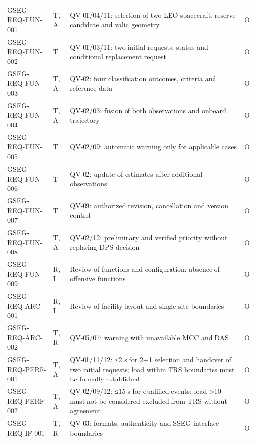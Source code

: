 \begingroup{}
\begin{longtable}{|P{0.27}|P{0.14}|P{0.49}|P{0.10}|}
\hline{}
 &  &  & \\ \hline
\endhead
\hline\endlastfoot
GSEG-REQ-FUN-001 & T, A & QV-01/\allowbreak{}04/\allowbreak{}11: selection of two LEO spacecraft, reserve candidate and valid geometry & O\\ \hline
GSEG-REQ-FUN-002 & T & QV-01/\allowbreak{}03/\allowbreak{}11: two initial requests, status and conditional replacement request & O\\ \hline
GSEG-REQ-FUN-003 & T, A & QV-02: four classification outcomes, criteria and reference data & O\\ \hline
GSEG-REQ-FUN-004 & T, A & QV-02/\allowbreak{}03: fusion of both observations and onboard trajectory & O\\ \hline
GSEG-REQ-FUN-005 & T & QV-02/\allowbreak{}09: automatic warning only for applicable cases & O\\ \hline
GSEG-REQ-FUN-006 & T & QV-02: update of estimates after additional observations & O\\ \hline
GSEG-REQ-FUN-007 & T & QV-09: authorized revision, cancellation and version control & O\\ \hline
GSEG-REQ-FUN-008 & T, A & QV-02/\allowbreak{}12: preliminary and verified priority without replacing DPS decision & O\\ \hline
GSEG-REQ-FUN-009 & R, I & Review of functions and configuration: absence of offensive functions & O\\ \hline
GSEG-REQ-ARC-001 & R, I & Review of facility layout and single-site boundaries & O\\ \hline
GSEG-REQ-ARC-002 & T, R & QV-05/\allowbreak{}07: warning with unavailable MCC and DAS & O\\ \hline
GSEG-REQ-PERF-001 & T, A & QV-01/\allowbreak{}11/\allowbreak{}12: ≤2 s for 2+1 selection and handover of two initial requests; load within TRS boundaries must be formally established & O\\ \hline
GSEG-REQ-PERF-002 & T, A & QV-02/\allowbreak{}09/\allowbreak{}12: ≤15 s for qualified events; load >10 must not be considered excluded from TRS without agreement & O\\ \hline
GSEG-REQ-IF-001 & T, R & QV-03: formats, authenticity and SSEG interface boundaries & O\\ \hline

\end{longtable}
